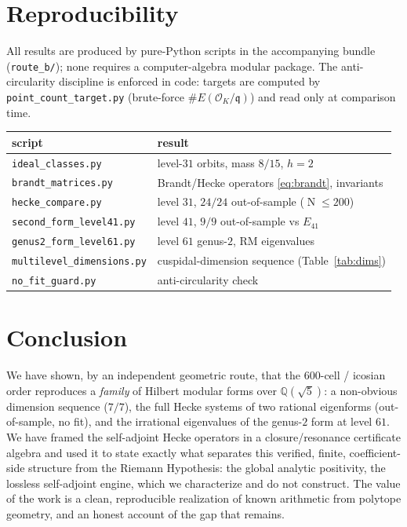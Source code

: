 \documentclass[11pt,a4paper]{article}
\newcommand{\Q}{\mathbb{Q}}
\newcommand{\Ord}{\mathcal{O}}
\newcommand{\fq}{\mathfrak{q}}
\newcommand{\OK}{\Ord_K}
\DeclareMathOperator{\Nm}{N}
\begin{document}
\section{Reproducibility}\label{sec:repro}

All results are produced by pure-Python scripts in the accompanying
bundle (\texttt{route\_b/}); none requires a computer-algebra modular
package. The anti-circularity discipline is enforced in code: targets
are computed by \texttt{point\_count\_target.py} (brute-force
$\#E(\OK/\fq)$) and read only at comparison time.
\begin{center}
\small
\begin{tabular}{ll}
\toprule
script & result \\
\midrule
\texttt{ideal\_classes.py} & level-$31$ orbits, mass $8/15$, $h=2$ \\
\texttt{brandt\_matrices.py} & Brandt/Hecke operators \eqref{eq:brandt}, invariants \\
\texttt{hecke\_compare.py} & level $31$, $24/24$ out-of-sample ($\Nm\le200$) \\
\texttt{second\_form\_level41.py} & level $41$, $9/9$ out-of-sample vs $E_{41}$ \\
\texttt{genus2\_form\_level61.py} & level $61$ genus-$2$, RM eigenvalues \\
\texttt{multilevel\_dimensions.py} & cuspidal-dimension sequence (Table~\ref{tab:dims}) \\
\texttt{no\_fit\_guard.py} & anti-circularity check \\
\bottomrule
\end{tabular}
\end{center}

\section{Conclusion}

We have shown, by an independent geometric route, that the $600$-cell /
icosian order reproduces a \emph{family} of Hilbert modular forms over
$\Q(\sqrt5)$: a non-obvious dimension sequence ($7/7$), the full Hecke
systems of two rational eigenforms (out-of-sample, no fit), and the
irrational eigenvalues of the genus-$2$ form at level $61$. We have
framed the self-adjoint Hecke operators in a closure/resonance
certificate algebra and used it to state exactly what separates this
verified, finite, coefficient-side structure from the Riemann
Hypothesis: the global analytic positivity, the lossless self-adjoint
engine, which we characterize and do not construct. The value of the
work is a clean, reproducible realization of known arithmetic from
polytope geometry, and an honest account of the gap that remains.



\end{document}
